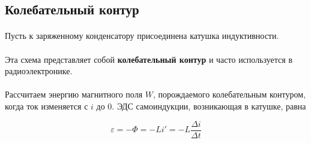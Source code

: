 \documentclass[dvipdfmx]{article}
\begin{document}
\subsection{Колебательный контур}
\paragraph{}

Пусть к заряженному конденсатору присоединена катушка индуктивности.


\noindent{}
\paragraph{}

Эта схема представляет собой \textbf{колебательный контур} и часто используется в радиоэлектронике.

\paragraph{}

Рассчитаем энергию магнитного поля $W$, порождаемого колебательным контуром, когда ток изменяется с $i$ до 0.
ЭДС самоиндукции, возникающая в катушке, равна

\begin{equation*}
  \varepsilon = -\Phi = -Li' = -L\frac{\Delta i}{\Delta t}
\end{equation*}
\paragraph{}
\end{document}
